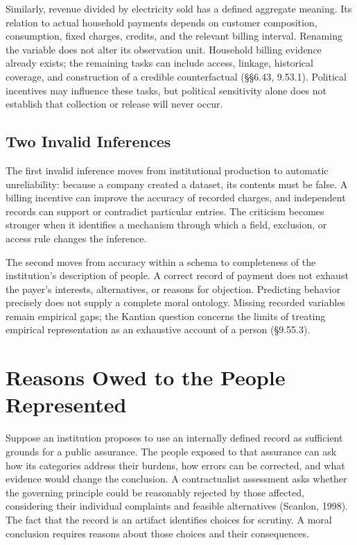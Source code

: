 Similarly, revenue divided by electricity sold has a defined aggregate
meaning. Its relation to actual household payments depends on customer
composition, consumption, fixed charges, credits, and the relevant
billing interval. Renaming the variable does not alter its observation
unit. Household billing evidence already exists; the remaining tasks can
include access, linkage, historical coverage, and construction of a
credible counterfactual (§§6.43, 9.53.1). Political incentives may
influence these tasks, but political sensitivity alone does not
establish that collection or release will never occur.

\hypertarget{M09-two-invalid-inferences}{%
\subsection{Two Invalid Inferences}\label{M09-two-invalid-inferences}}

\noindent The first invalid inference moves from institutional production to
automatic unreliability: because a company created a dataset, its
contents must be false. A billing incentive can improve the accuracy of
recorded charges, and independent records can support or contradict
particular entries. The criticism becomes stronger when it identifies a
mechanism through which a field, exclusion, or access rule changes the
inference.

The second moves from accuracy within a schema to completeness of the
institution's description of people. A correct record of payment does
not exhaust the payer's interests, alternatives, or reasons for
objection. Predicting behavior precisely does not supply a complete
moral ontology. Missing recorded variables remain empirical gaps; the
Kantian question concerns the limits of treating empirical
representation as an exhaustive account of a person (§9.55.3).


\hypertarget{M09-reasons-owed-to-the-people-represented}{%
\section{Reasons Owed to the People
Represented}\label{M09-reasons-owed-to-the-people-represented}}

\noindent Suppose an institution proposes to use an internally defined record as
sufficient grounds for a public assurance. The people exposed to that
assurance can ask how its categories address their burdens, how errors
can be corrected, and what evidence would change the conclusion. A
contractualist assessment asks whether the governing principle could be
reasonably rejected by those affected, considering their individual
complaints and feasible alternatives (Scanlon, 1998). The fact that the
record is an artifact identifies choices for scrutiny. A moral
conclusion requires reasons about those choices and their consequences.


